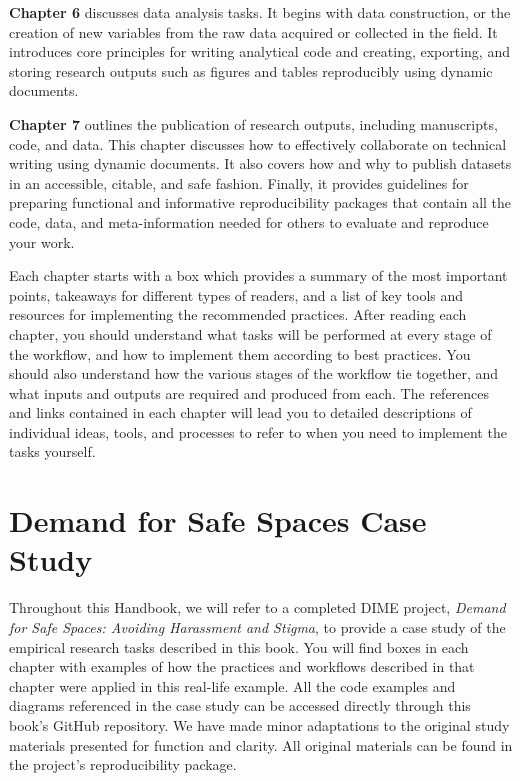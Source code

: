 \documentclass[]{tufte-book}
\begin{document}
\textbf{Chapter 6} discusses data analysis tasks. It begins with data
construction, or the creation of new variables from the raw data
acquired or collected in the field. It introduces core principles for
writing analytical code and creating, exporting, and storing research
outputs such as figures and tables reproducibly using dynamic documents.

\textbf{Chapter 7} outlines the publication of research outputs,
including manuscripts, code, and data. This chapter discusses how to
effectively collaborate on technical writing using dynamic documents. It
also covers how and why to publish datasets in an accessible, citable,
and safe fashion. Finally, it provides guidelines for preparing
functional and informative reproducibility packages that contain all the
code, data, and meta-information needed for others to evaluate and
reproduce your work.

Each chapter starts with a box which provides a summary of the most
important points, takeaways for different types of readers, and a list
of key tools and resources for implementing the recommended practices.
After reading each chapter, you should understand what tasks will be
performed at every stage of the workflow, and how to implement them
according to best practices. You should also understand how the various
stages of the workflow tie together, and what inputs and outputs are
required and produced from each. The references and links contained in
each chapter will lead you to detailed descriptions of individual ideas,
tools, and processes to refer to when you need to implement the tasks
yourself.


\hypertarget{demand-for-safe-spaces-case-study}{%
\chapter{Demand for Safe Spaces Case
Study}\label{demand-for-safe-spaces-case-study}}

Throughout this Handbook, we will refer to a completed DIME project,
\emph{Demand for Safe Spaces: Avoiding Harassment and Stigma}, to
provide a case study of the empirical research tasks described in this
book. You will find boxes in each chapter with examples of how the
practices and workflows described in that chapter were applied in this
real-life example. All the code examples and diagrams referenced in the
case study can be accessed directly through this book's GitHub
repository. We have made minor adaptations to the original study
materials presented for function and clarity. All original materials can
be found in the project's reproducibility package.
\end{document}
